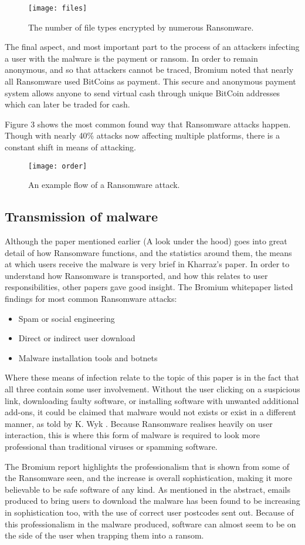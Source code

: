\documentclass[journal,comsoc]{IEEEtran}
\begin{document}
\begin{figure}[H]
  \caption{The number of file types encrypted by numerous Ransomware.}
  \centering
  \label{fig:files}
    \texttt{[image: files]}
\end{figure}
The final aspect, and most important part to the process of an attackers infecting a user with the malware is the payment or ransom. In order to remain anonymous, and so that attackers cannot be traced, Bromium noted that nearly all Ransomware used BitCoins as payment. This secure and anonymous payment system allows anyone to send virtual cash through unique BitCoin addresses which can later be traded for cash. \par
Figure 3 shows the most common found way that Ransomware attacks happen. Though with nearly 40\% attacks now affecting multiple platforms, there is a constant shift in means of attacking.
\begin{figure}[H]
  \caption{An example flow of a Ransomware attack.}
  \centering
  \label{fig:order}
    \texttt{[image: order]}
\end{figure}
\subsection{Transmission of malware}
Although the paper mentioned earlier (A look under the hood) goes into great detail of how Ransomware functions, and the statistics around them, the means at which users receive the malware is very brief in Kharraz's paper. In order to understand how Ransomware is transported, and how this relates to user responsibilities, other papers gave good insight. The Bromium whitepaper listed findings for most common Ransomware attacks:
\begin{itemize}
\item Spam or social engineering
\item Direct or indirect user download
\item Malware installation tools and botnets
\end{itemize}
Where these means of infection relate to the topic of this paper is in the fact that all three contain some user involvement. Without the user clicking on a suspicious link, downloading faulty software, or installing software with unwanted additional add-ons, it could be claimed that malware would not exists or exist in a different manner, as told by K. Wyk \cite{artical}. Because Ransomware realises heavily on user interaction, this is where this form of malware is required to look more professional than traditional viruses or spamming software. \par
The Bromium report highlights the professionalism that is shown from some of the Ransomware seen, and the increase is overall sophistication, making it more believable to be safe software of any kind. As mentioned in the abstract, emails produced to bring users to download the malware has been found to be increasing in sophistication too, with the use of correct user postcodes sent out. Because of this professionalism in the malware produced, software can almost seem to be on the side of the user when trapping them into a ransom. \par
\end{document}
